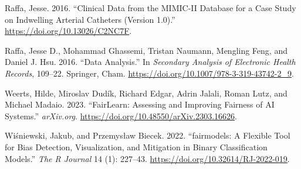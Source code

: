 \documentclass[10pt,a4paper,onecolumn]{article}
\newlength{\cslhangindent}
\newenvironment{CSLReferences}[2] %
 {\begin{list}{}{%
  \setlength{\itemindent}{0pt}
  \setlength{\leftmargin}{0pt}
  \setlength{\parsep}{0pt}
  \ifodd #1
   \setlength{\leftmargin}{\cslhangindent}
   \setlength{\itemindent}{-1\cslhangindent}
  \fi
  \setlength{\itemsep}{#2\baselineskip}}}
 {\end{list}}
\begin{document}
\begin{CSLReferences}{1}{0}
Raffa, Jesse. 2016. {``Clinical Data from the MIMIC-II Database for a
Case Study on Indwelling Arterial Catheters (Version 1.0).''}
\url{https://doi.org/10.13026/C2NC7F}.

Raffa, Jesse D., Mohammad Ghassemi, Tristan Naumann, Mengling Feng, and
Daniel J. Hsu. 2016. {``Data Analysis.''} In \emph{Secondary Analysis of
Electronic Health Records}, 109--22. Springer, Cham.
\url{https://doi.org/10.1007/978-3-319-43742-2_9}.

Weerts, Hilde, Miroslav Dudík, Richard Edgar, Adrin Jalali, Roman Lutz,
and Michael Madaio. 2023. {``FairLearn: Assessing and Improving Fairness
of AI Systems.''} \emph{arXiv.org}.
\url{https://doi.org/10.48550/arXiv.2303.16626}.

Wiśniewski, Jakub, and Przemysław Biecek. 2022. {``{fairmodels}: A
Flexible Tool for Bias Detection, Visualization, and Mitigation in
Binary Classification Models.''} \emph{The R Journal} 14 (1): 227--43.
\url{https://doi.org/10.32614/RJ-2022-019}.

\end{CSLReferences}
\end{document}
